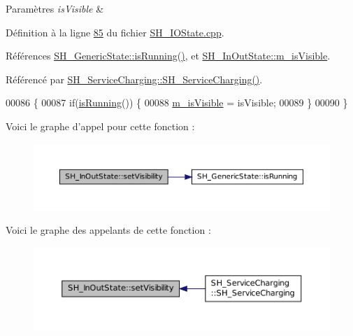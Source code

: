 \begin{DoxyParams}{Paramètres}
{\em is\-Visible} & \\
\hline
\end{DoxyParams}


Définition à la ligne \hyperlink{SH__IOState_8cpp_source_l00085}{85} du fichier \hyperlink{SH__IOState_8cpp_source}{S\-H\-\_\-\-I\-O\-State.\-cpp}.



Références \hyperlink{classSH__GenericState_a5f731810dad0cacd28828ccbf1539e4e}{S\-H\-\_\-\-Generic\-State\-::is\-Running()}, et \hyperlink{classSH__InOutState_a8fd66b185c9a55f0e84daa97e2acf53a}{S\-H\-\_\-\-In\-Out\-State\-::m\-\_\-is\-Visible}.



Référencé par \hyperlink{classSH__ServiceCharging_afa5273d046049b1c2b020a6a19a8290b}{S\-H\-\_\-\-Service\-Charging\-::\-S\-H\-\_\-\-Service\-Charging()}.


\begin{DoxyCode}
00086 \{
00087     \textcolor{keywordflow}{if}(\hyperlink{classSH__GenericState_a5f731810dad0cacd28828ccbf1539e4e}{isRunning}()) \{
00088         \hyperlink{classSH__InOutState_a8fd66b185c9a55f0e84daa97e2acf53a}{m\_isVisible} = isVisible;
00089     \}
00090 \}
\end{DoxyCode}


Voici le graphe d'appel pour cette fonction \-:\nopagebreak
\begin{figure}[H]
\begin{center}
\leavevmode
\includegraphics[width=350pt]{classSH__InOutState_a7fdfaa6f600f0ac4a96f238a038ba9ad_cgraph}
\end{center}
\end{figure}




Voici le graphe des appelants de cette fonction \-:\nopagebreak
\begin{figure}[H]
\begin{center}
\leavevmode
\includegraphics[width=350pt]{classSH__InOutState_a7fdfaa6f600f0ac4a96f238a038ba9ad_icgraph}
\end{center}
\end{figure}


